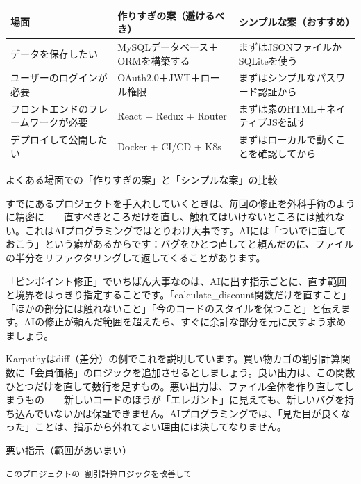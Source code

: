 \begin{center}
\begin{tabularx}{\linewidth}{|X|X|X|}
\hline
\textbf{場面} & \textbf{作りすぎの案（避けるべき）} & \textbf{シンプルな案（おすすめ）} \tabularnewline
\hline
データを保存したい & MySQLデータベース＋ORMを構築する & まずはJSONファイルかSQLiteを使う \tabularnewline
ユーザーのログインが必要 & OAuth2.0＋JWT＋ロール権限 & まずはシンプルなパスワード認証から \tabularnewline
フロントエンドのフレームワークが必要 & React + Redux + Router & まずは素のHTML＋ネイティブJSを試す \tabularnewline
デプロイして公開したい & Docker + CI/CD + K8s & まずはローカルで動くことを確認してから \tabularnewline
\hline
\end{tabularx}
\end{center}

\begin{center}\small\color{gray}よくある場面での「作りすぎの案」と「シンプルな案」の比較\end{center}


すでにあるプロジェクトを手入れしていくときは、毎回の修正を外科手術のように精密に——直すべきところだけを直し、触れてはいけないところには触れない。これはAIプログラミングではとりわけ大事です。AIには「ついでに直しておこう」という癖があるからです：バグをひとつ直してと頼んだのに、ファイルの半分をリファクタリングして返してくることがあります。

「ピンポイント修正」でいちばん大事なのは、AIに出す指示ごとに、直す範囲と境界をはっきり指定することです。「calculate\_discount関数だけを直すこと」「ほかの部分には触れないこと」「今のコードのスタイルを保つこと」と伝えます。AIの修正が頼んだ範囲を超えたら、すぐに余計な部分を元に戻すよう求めましょう。

Karpathyはdiff（差分）の例でこれを説明しています。買い物カゴの割引計算関数に「会員価格」のロジックを追加させるとしましょう。良い出力は、この関数ひとつだけを直して数行を足すもの。悪い出力は、ファイル全体を作り直してしまうもの——新しいコードのほうが「エレガント」に見えても、新しいバグを持ち込んでいないかは保証できません。AIプログラミングでは、「見た目が良くなった」ことは、指示から外れてよい理由には決してなりません。

悪い指示（範囲があいまい）

\begin{lstlisting}
このプロジェクトの 割引計算ロジックを改善して
\end{lstlisting}

